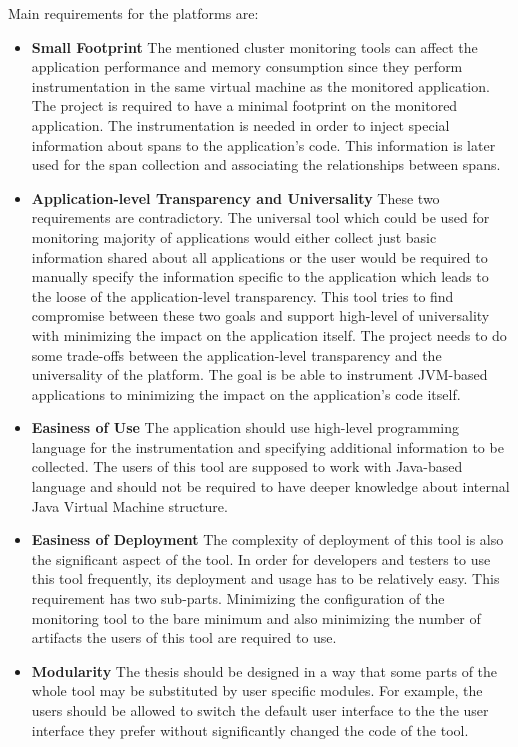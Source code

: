 Main requirements for the platforms are:
\begin{itemize}
	\item \textbf{Small Footprint} \newline
	 The mentioned cluster monitoring tools can affect the application performance and memory consumption since they perform instrumentation in the same virtual machine as the monitored application. The project is required to have a minimal footprint on the monitored application. The instrumentation is needed in order to inject special information about spans to the application's code. This information is later used for the span collection and associating the relationships between spans.
	\item \textbf{Application-level Transparency and Universality} \newline
	These two requirements are contradictory. The universal tool which could be used for monitoring majority of applications would either collect just basic information shared about all applications or the user would be required to manually specify the information specific to the application which leads to the loose of the application-level transparency. This tool tries to find compromise between these two goals and support high-level of universality with minimizing the impact on the application itself.
	The project needs to do some trade-offs between the application-level transparency and the universality of the platform. The goal is be able to instrument JVM-based applications to minimizing the impact on the application's code itself.
	\item \textbf{Easiness of Use} \newline
	The application should use high-level programming language for the instrumentation and specifying additional information to be collected. The users of this tool are supposed to work with Java-based language and should not be required to have deeper knowledge about internal Java Virtual Machine structure.
	\item \textbf{Easiness of Deployment} \newline
	The complexity of deployment of this tool is also the significant aspect of the tool. In order for developers and testers to use this tool frequently, its deployment and usage has to be relatively easy. This requirement has two sub-parts. Minimizing the configuration of the monitoring tool to the bare minimum and also minimizing the number of artifacts the users of this tool are required to use.
	\item \textbf{Modularity} \newline
	The thesis should be designed in a way that some parts of the whole tool may be substituted by user specific modules. For example, the users should be allowed to switch the default user interface to the the user interface they prefer without significantly changed the code of the tool.
\end{itemize}

